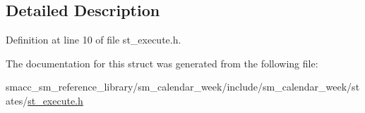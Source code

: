 \subsection{Detailed Description}


Definition at line 10 of file st\+\_\+execute.\+h.



The documentation for this struct was generated from the following file\+:\begin{DoxyCompactItemize}
\item 
smacc\+\_\+sm\+\_\+reference\+\_\+library/sm\+\_\+calendar\+\_\+week/include/sm\+\_\+calendar\+\_\+week/states/\hyperlink{sm__calendar__week_2include_2sm__calendar__week_2states_2st__execute_8h}{st\+\_\+execute.\+h}\end{DoxyCompactItemize}
